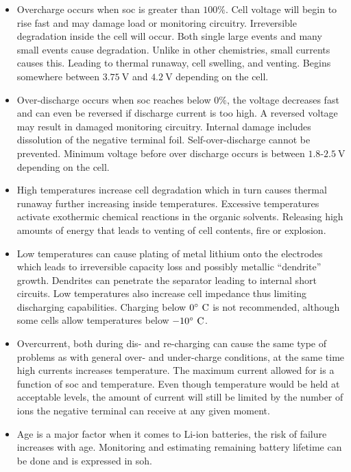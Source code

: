 \begin{itemize}
\item Overcharge occurs when \gls{soc} is greater than $100\%$. Cell voltage will begin to rise fast and may damage load or monitoring circuitry. Irreversible degradation inside the cell will occur. Both single large events and many small events cause degradation. Unlike in other chemistries, small currents causes this. Leading to thermal runaway, cell swelling, and venting. Begins somewhere between $3.75~\textrm{V}$ and $4.2~\textrm{V}$ depending on the cell.
\item Over-discharge occurs when \gls{soc} reaches below $0\%$, the voltage decreases fast and can even be reversed if discharge current is too high. A reversed voltage may result in damaged monitoring circuitry. Internal damage includes dissolution of the negative terminal foil. Self-over-discharge cannot be prevented. Minimum voltage before over discharge occurs is between $1.8$-$2.5~\textrm{V}$ depending on the cell.
\item High temperatures increase cell degradation which in turn causes thermal runaway further increasing inside temperatures. Excessive temperatures activate exothermic chemical reactions in the organic solvents. Releasing high amounts of energy that leads to venting of cell contents, fire or explosion.
\item Low temperatures can cause plating of metal lithium onto the electrodes which leads to irreversible capacity loss and possibly metallic ``dendrite'' growth. Dendrites can penetrate the separator leading to internal short circuits. Low temperatures also increase cell impedance thus limiting discharging capabilities. Charging below $0\degree~\textrm{C}$ is not recommended, although some cells allow temperatures below $-10\degree~\textrm{C}$.
\item Overcurrent, both during dis- and re-charging can cause the same type of problems as with general over- and under-charge conditions, at the same time high currents increases temperature. The maximum current allowed for is a function of \gls{soc} and temperature. Even though temperature would be held at acceptable levels, the amount of current will still be limited by the number of ions the negative terminal can receive at any given moment.
\item Age is a major factor when it comes to Li-ion batteries, the risk of failure increases with age. Monitoring and estimating remaining battery lifetime can be done and is expressed in \gls{soh}.
\end{itemize}

